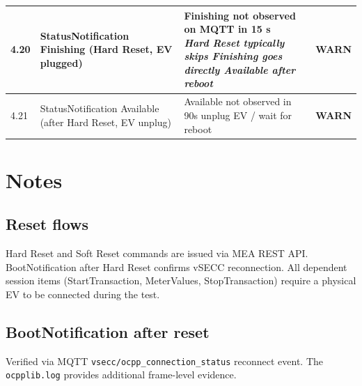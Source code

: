 \documentclass[10pt, a4paper]{article}
\begin{document}
\begin{longtable}{|L{1cm}|L{5.5cm}|M{7cm}|C{1.8cm}|}
\hline
\small 4.20 & \small StatusNotification Finishing (Hard Reset, EV plugged) & Finishing not observed on MQTT in 15 s{\newline\normalfont\footnotesize\itshape Hard Reset typically skips Finishing  goes directly Available after reboot} & \textcolor{warnorange}{\textbf{WARN}} \\
\hline
\small 4.21 & \small StatusNotification Available (after Hard Reset, EV unplug) & Available not observed in 90s  unplug EV / wait for reboot & \textcolor{warnorange}{\textbf{WARN}} \\
\hline
\end{longtable}
\normalsize

\section{Notes}

\subsection*{Reset flows}
Hard Reset and Soft Reset commands are issued via MEA REST API.
BootNotification after Hard Reset confirms vSECC reconnection.
All dependent session items (StartTransaction, MeterValues, StopTransaction)
require a physical EV to be connected during the test.

\subsection*{BootNotification after reset}
Verified via MQTT \texttt{vsecc/ocpp\_connection\_status} reconnect event.
The \texttt{ocpplib.log} provides additional frame-level evidence.
\end{document}

